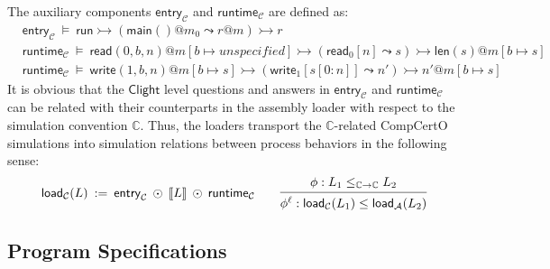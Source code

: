 \documentclass[acmsmall,screen,review,anonymous,nonacm]{acmart}
\newcommand{\kw}[1]{\ensuremath{ \mathsf{#1} }}
\begin{document}
The auxiliary components
$\kw{entry}_\mathcal{C}$ and
$\kw{runtime}_\mathcal{C}$
are defined as:
{\small
\begin{align*}
  & \kw{entry}_\mathcal{C} \:\vDash\:
  \kw{run} \rightarrowtail
  (\kw{main}()@m_0 \leadsto r@m) \rightarrowtail r \\
  & \kw{runtime}_\mathcal{C} \:\vDash\:
  \kw{read}(0, b, n)@m[b \mapsto unspecified]
   \rightarrowtail (\kw{read}_0[n] \leadsto s)
    \rightarrowtail \kw{len}(s)@m[b \mapsto s] \\
  & \kw{runtime}_\mathcal{C} \:\vDash\:
    \kw{write}(1, b, n)@m[b \mapsto s]
   \rightarrowtail
  (\kw{write}_1[s[0:n]] \leadsto n')
  \rightarrowtail n'@m[b \mapsto s]
\end{align*}}%
It is obvious that
the \kw{Clight} level
questions and answers
in $\kw{entry}_\mathcal{C}$ and $\kw{runtime}_\mathcal{C}$
can be related
with their counterparts in the assembly loader
with respect to
the simulation convention $\mathbb{C}$.
Thus, the loaders
transport
the $\mathbb{C}$-related CompCertO simulations
into
simulation relations
between process behaviors
in the following sense:
\[
  \kw{load}_\mathcal{C}(L)
  \::=\: \kw{entry}_\mathcal{C} \: \odot \: \llbracket L \rrbracket
  \: \odot \: \kw{runtime}_\mathcal{C}
  \qquad
  \begin{prooftree}
    \hypo{\phi: L_1 \le_{\mathbb{C} \rightarrow \mathbb{C}} L_2}
    \infer1{\phi^\ell: \kw{load}_\mathcal{C}(L_1) \le
      \kw{load}_\mathcal{A}(L_2)}
  \end{prooftree}
\]

\subsection{Program Specifications}
\end{document}
